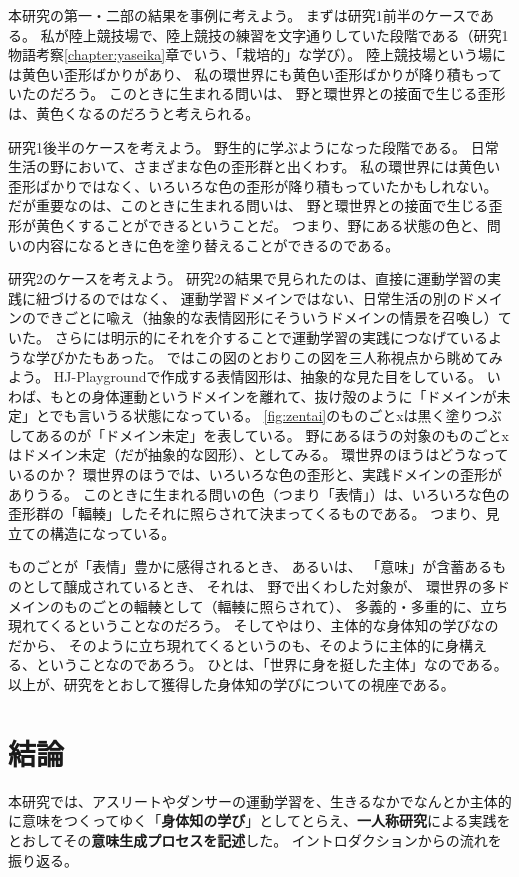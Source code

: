 本研究の第一・二部の結果を事例に考えよう。
まずは研究1前半のケースである。
私が陸上競技場で、陸上競技の練習を文字通りしていた段階である（研究1物語考察\ref{chapter:yaseika}章でいう、「栽培的」\cite{levi-strauss:1962}な学び）。
陸上競技場という場には黄色い歪形ばかりがあり、
私の環世界にも黄色い歪形ばかりが降り積もっていたのだろう。
このときに生まれる問いは、
野と環世界との接面で生じる歪形は、黄色くなるのだろうと考えられる。

研究1後半のケースを考えよう。
野生的\cite{levi-strauss:1962}に学ぶようになった段階である。
日常生活の野において、さまざまな色の歪形群と出くわす。
私の環世界には黄色い歪形ばかりではなく、いろいろな色の歪形が降り積もっていたかもしれない。
だが重要なのは、このときに生まれる問いは、
野と環世界との接面で生じる歪形が黄色くすることができるということだ。
つまり、野にある状態の色と、問いの内容になるときに色を塗り替えることができるのである。

研究2のケースを考えよう。
研究2の結果で見られたのは、直接に運動学習の実践に紐づけるのではなく、
運動学習ドメインではない、日常生活の別のドメインのできごとに喩え（抽象的な表情図形にそういうドメインの情景を召喚し）ていた。
さらには明示的にそれを介することで運動学習の実践につなげているような学びかたもあった。
ではこの図のとおりこの図を三人称視点から眺めてみよう。
HJ-Playgroundで作成する表情図形は、抽象的な見た目をしている。
いわば、もとの身体運動というドメインを離れて、抜け殻のように「ドメインが未定」とでも言いうる状態になっている。
\autoref{fig:zentai}のものごとxは黒く塗りつぶしてあるのが「ドメイン未定」を表している。
野にあるほうの対象のものごとxはドメイン未定（だが抽象的な図形）、としてみる。
環世界のほうはどうなっているのか？
環世界のほうでは、いろいろな色の歪形と、実践ドメインの歪形がありうる。
このときに生まれる問いの色（つまり「表情」）は、いろいろな色の歪形群の「輻輳」したそれに照らされて決まってくるものである。
つまり、見立ての構造になっている。

ものごとが「表情」豊かに感得されるとき、
あるいは、
「意味」が含蓄あるものとして醸成されているとき、
それは、
野で出くわした対象が、
環世界の多ドメインのものごとの輻輳として（輻輳に照らされて）、
多義的・多重的に、立ち現れてくるということなのだろう。
そしてやはり、主体的な身体知の学びなのだから、
そのように立ち現れてくるというのも、そのように主体的に身構える、ということなのであろう。
ひとは、「世界に身を挺した主体」なのである\cite{merleau-ponty:1945}。
以上が、研究をとおして獲得した身体知の学びについての視座である。



\chapter{結論}
本研究では、アスリートやダンサーの運動学習を、生きるなかでなんとか主体的に意味をつくってゆく「\textbf{身体知の学び}」としてとらえ、\textbf{一人称研究}による実践をとおしてその\textbf{意味生成プロセスを記述}した。
イントロダクションからの流れを振り返る。

